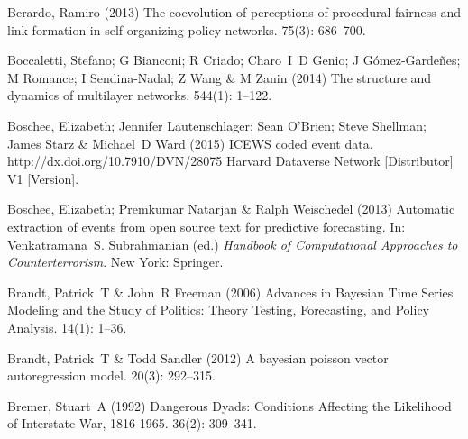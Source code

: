 \documentclass[3p,times,twocolumn,authoryear,12pt]{elsarticle}
\begin{document}
\begin{thebibliography}{}

Berardo, Ramiro (2013) The coevolution of perceptions of procedural fairness
  and link formation in self-organizing policy networks.
 { 75\/}(3): 686--700.

Boccaletti, Stefano; G Bianconi; R Criado; Charo~I~D Genio; J
  G{\'o}mez-Garde{\~n}es; M Romance; I Sendina-Nadal; Z Wang  \& M Zanin (2014)
  The structure and dynamics of multilayer networks.
 { 544\/}(1): 1--122.

Boschee, Elizabeth; Jennifer Lautenschlager; Sean O'Brien; Steve Shellman;
  James Starz  \& Michael~D Ward (2015) {ICEWS} coded event data.
\newblock http://dx.doi.org/10.7910/DVN/28075 Harvard Dataverse Network
  [Distributor] V1 [Version].

Boschee, Elizabeth; Premkumar Natarjan  \& Ralph Weischedel (2013) Automatic
  extraction of events from open source text for predictive forecasting.
\newblock In: Venkatramana~S. Subrahmanian (ed.) {\em Handbook of Computational
  Approaches to Counterterrorism}. New York: Springer.

Brandt, Patrick~T  \& John~R Freeman (2006) {Advances in Bayesian Time Series
  Modeling and the Study of Politics: Theory Testing, Forecasting, and Policy
  Analysis}.
 { 14\/}(1): 1--36.

Brandt, Patrick~T  \& Todd Sandler (2012) A bayesian poisson vector
  autoregression model.
 { 20\/}(3): 292--315.

Bremer, Stuart~A (1992) {Dangerous Dyads: Conditions Affecting the Likelihood
  of Interstate War, 1816-1965}.
 { 36\/}(2): 309--341.


\end{thebibliography}
\end{document}
